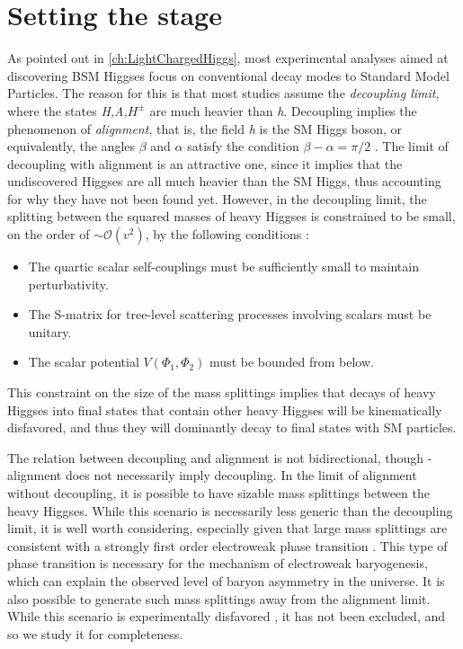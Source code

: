 \section{Setting the stage}\label{sec:setting_the_stage}
As pointed out in \autoref{ch:LightChargedHiggs}, most experimental analyses aimed at discovering BSM Higgses focus on conventional decay modes to Standard Model Particles. The reason for this is that most studies assume the \emph{decoupling limit}, where the states \emph{H,A,$H^\pm$} are much heavier than \emph{h}. Decoupling implies the phenomenon of \emph{alignment}, that is, the field \emph{h} is the SM Higgs boson, or equivalently, the angles $\beta$ and $\alpha$ satisfy the condition $\beta-\alpha = \pi/2$ \cite{Contino:2016spe}. The limit of decoupling with alignment is an attractive one, since it implies that the undiscovered Higgses are all much heavier than the SM Higgs, thus accounting for why they have not been found yet. However, in the decoupling limit, the splitting between the squared masses of heavy Higgses is constrained to be small, on the order of $\sim\mathcal{O}(v^2)$, by the following conditions \cite{Gunion:2002zf}:
\begin{itemize}
\item The quartic scalar self-couplings must be sufficiently small to maintain perturbativity.
\item The S-matrix for tree-level scattering processes involving scalars must be unitary.
\item The scalar potential $V(\Phi_1,\Phi_2)$ must be bounded from below. 
\end{itemize}
This constraint on the size of the mass splittings implies that decays of heavy Higgses into final states that contain other heavy Higgses will be kinematically disfavored, and thus they will dominantly decay to final states with SM particles.

The relation between decoupling and alignment is not bidirectional, though - alignment does not necessarily imply decoupling. In the limit of alignment without decoupling, it is possible to have sizable mass splittings between the heavy Higgses. While this scenario is necessarily less generic than the decoupling limit, it is well worth considering, especially given that large mass splittings are consistent with a strongly first order electroweak phase transition \cite{Dorsch:2014qja}. This type of phase transition is necessary for the mechanism of electroweak baryogenesis, which can explain the observed level of baryon asymmetry in the universe. It is also possible to generate such mass splittings away from the alignment limit. While this scenario is experimentally disfavored \cite{Aad:2015pla}, it has not been excluded, and so we study it for completeness.

